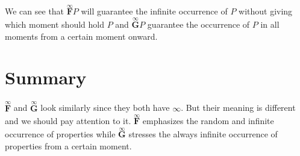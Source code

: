 \documentclass{acmtog} %
\begin{document}
    We can see that $\overset{\infty}{\textbf{F}}P$ will guarantee the infinite occurrence of $P$ without giving which moment should hold $P$ and $\overset{\infty}{\textbf{G}}P$ guarantee the occurrence of $P$ in all moments from a certain moment onward.
\section{Summary}
    $\overset{\infty}{\textbf{F}}$ and $\overset{\infty}{\textbf{G}}$ look similarly since they both have $\infty$. But their meaning is different and we should pay attention to it. $\overset{\infty}{\textbf{F}}$ emphasizes the random and infinite occurrence of properties while $\overset{\infty}{\textbf{G}}$ stresses the always infinite occurrence of properties from a certain moment.
\end{document}
